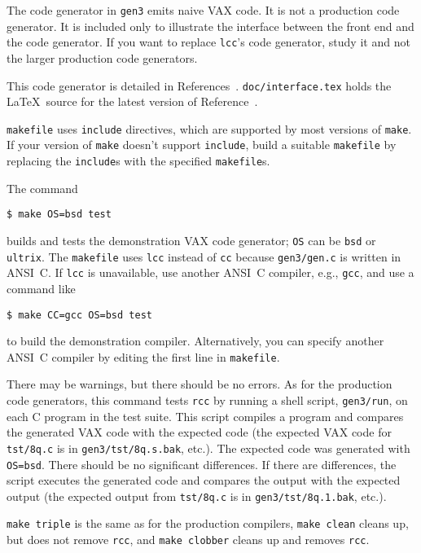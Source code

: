 The code generator in \verb|gen3| emits naive VAX code.
It is not a production code generator. It is included only
to illustrate the interface between the front end
and the code generator. If you want to replace \verb|lcc|'s code generator,
study it and not the larger production code generators.

This code generator is detailed in
References~\cite{fraser:hanson:interface:TR,fraser:hanson:91a,fraser:hanson:92}.
\verb|doc/interface.tex| holds the \LaTeX\ source for the latest
version of Reference~\cite{fraser:hanson:interface:TR}.

\verb|makefile| uses \verb|include| directives, which are supported by
most versions of \verb|make|. If your version of \verb|make|
doesn't support \verb|include|, build a suitable \verb|makefile|
by replacing the \verb|include|s with the specified \verb|makefile|s.

The command
\begin{verbatim}
$ make OS=bsd test
\end{verbatim}
builds and tests the demonstration VAX code generator;
\verb|OS| can be \verb|bsd| or \verb|ultrix|.
The \verb|makefile| uses \verb|lcc| instead of \verb|cc|
because \verb|gen3/gen.c| is written in ANSI~C.
If \verb|lcc| is unavailable, use another ANSI~C compiler, e.g., \verb|gcc|,
and use a command like
\begin{verbatim}
$ make CC=gcc OS=bsd test
\end{verbatim}
to build the demonstration compiler. Alternatively, you can specify
another ANSI~C compiler by editing the first line in \verb|makefile|.

There may be warnings, but there should be no errors.
As for the production code generators, this command
tests \verb|rcc| by running a shell script,
\verb|gen3/run|, on each C program in the test suite.
This script compiles a program and compares the generated VAX code
with the expected code (the expected VAX code for \verb|tst/8q.c| is
in \verb|gen3/tst/8q.s.bak|, etc.).
The expected code was generated with \verb|OS=bsd|.
There should be no significant differences.
If there are differences, the script executes the generated code
and compares the output with the expected output
(the expected output from \verb|tst/8q.c| is
in \verb|gen3/tst/8q.1.bak|, etc.).

\verb|make triple| is the same as for the production compilers,
\verb|make clean| cleans up, but does not remove \verb|rcc|, and
\verb|make clobber| cleans up and removes \verb|rcc|.

